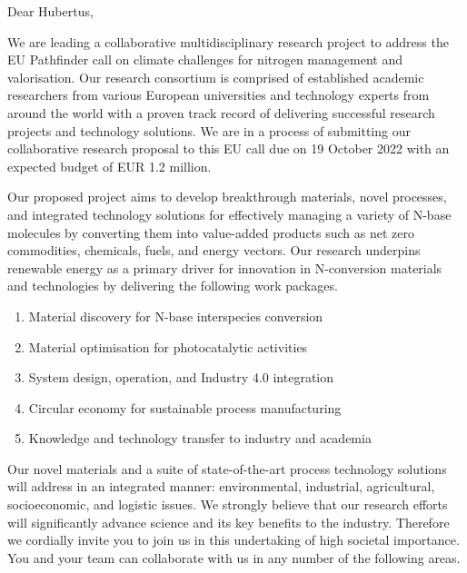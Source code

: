 \documentclass{materichLetter}
\begin{document}

Dear Hubertus,

We are leading a collaborative multidisciplinary research project to
address the EU Pathfinder call on climate challenges for nitrogen
management and valorisation. Our research consortium is comprised of
established academic researchers from various European universities
and technology experts from around the world with a proven track
record of delivering successful research projects and technology
solutions. We are in a process of submitting our collaborative
research proposal to this EU call due on 19 October 2022 with an
expected budget of EUR 1.2 million.

Our proposed project aims to develop breakthrough materials, novel
processes, and integrated technology solutions for effectively
managing a variety of N-base molecules by converting them into
value-added products such as net zero commodities, chemicals, fuels,
and energy vectors. Our research underpins renewable energy as a
primary driver for innovation in N-conversion materials and
technologies by delivering the following work packages.

\begin{enumerate}
\item Material discovery for N-base interspecies conversion
\item Material optimisation for photocatalytic activities
\item System design, operation, and Industry 4.0 integration
\item Circular economy for sustainable process manufacturing
\item Knowledge and technology transfer to industry and academia
\end{enumerate}

Our novel materials and a suite of state-of-the-art process
technology solutions will address in an integrated manner:
environmental, industrial, agricultural, socioeconomic, and logistic
issues. We strongly believe that our research efforts will
significantly advance science and its key benefits to the industry.
Therefore we cordially invite you to join us in this undertaking of
high societal importance. You and your team can collaborate with us
in any number of the following areas.
\end{document}
